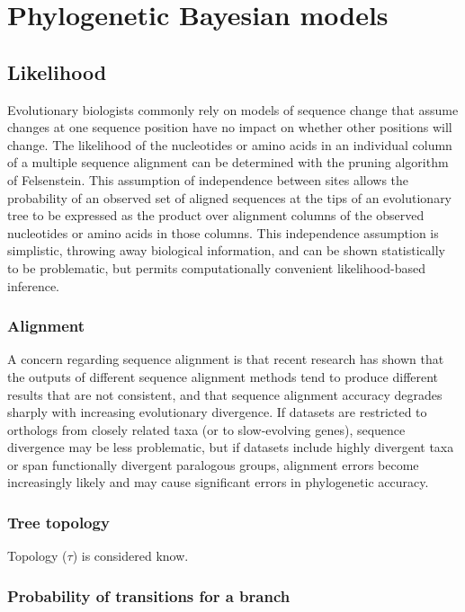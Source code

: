 \chapter{Phylogenetic Bayesian models}
\minitoc
\label{sec:phylo_bayes}

\section{Likelihood}

Evolutionary biologists commonly rely on models of sequence change that assume changes at one sequence position have no impact on whether other positions will change. The \gls{likelihood} of the nucleotides or amino acids in an individual column of a multiple sequence alignment can be determined with the pruning algorithm of Felsenstein. This assumption of independence between sites allows the probability of an observed set of aligned sequences at the tips of an evolutionary tree to be expressed as the product over alignment columns of the observed nucleotides or amino acids in those columns. This independence assumption is simplistic, throwing away biological information, and can be shown statistically to be problematic, but permits computationally convenient likelihood-based inference.

\subsection{Alignment}

A concern regarding sequence alignment is that recent research has shown that the outputs of different sequence alignment methods tend to produce different results that are not consistent, and that sequence alignment accuracy degrades sharply with increasing evolutionary divergence.
If datasets are restricted to orthologs from closely related taxa (or to slow-evolving genes), sequence divergence may be less problematic, but if datasets include highly divergent taxa or span functionally divergent paralogous groups, alignment errors become increasingly likely and may cause significant errors in phylogenetic accuracy.

\subsection{Tree topology}

Topology ($\tau$) is considered know.

\subsection{Probability of transitions for a branch}

